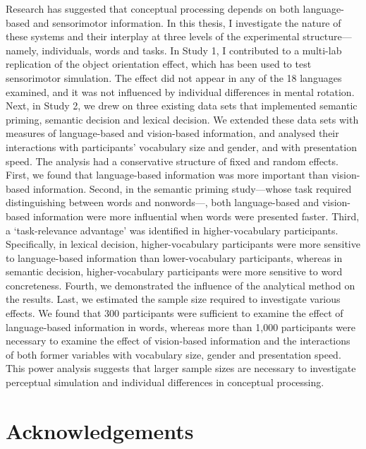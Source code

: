 \documentclass[
  12pt,
  man,floatsintext]{apa7}
\begin{document}
Research has suggested that conceptual processing depends on both language-based and sensorimotor information. In this thesis, I investigate the nature of these systems and their interplay at three levels of the experimental structure---namely, individuals, words and tasks. In Study 1, I contributed to a multi-lab replication of the object orientation effect, which has been used to test sensorimotor simulation. The effect did not appear in any of the 18 languages examined, and it was not influenced by individual differences in mental rotation. Next, in Study 2, we drew on three existing data sets that implemented semantic priming, semantic decision and lexical decision. We extended these data sets with measures of language-based and vision-based information, and analysed their interactions with participants' vocabulary size and gender, and with presentation speed. The analysis had a conservative structure of fixed and random effects. First, we found that language-based information was more important than vision-based information. Second, in the semantic priming study---whose task required distinguishing between words and nonwords---, both language-based and vision-based information were more influential when words were presented faster. Third, a `task-relevance advantage' was identified in higher-vocabulary participants. Specifically, in lexical decision, higher-vocabulary participants were more sensitive to language-based information than lower-vocabulary participants, whereas in semantic decision, higher-vocabulary participants were more sensitive to word concreteness. Fourth, we demonstrated the influence of the analytical method on the results. Last, we estimated the sample size required to investigate various effects. We found that 300 participants were sufficient to examine the effect of language-based information in words, whereas more than 1,000 participants were necessary to examine the effect of vision-based information and the interactions of both former variables with vocabulary size, gender and presentation speed. This power analysis suggests that larger sample sizes are necessary to investigate perceptual simulation and individual differences in conceptual processing.

\newpage

\begin{flushleft}
{
\tableofcontents
}
\end{flushleft}

\newpage

\hypertarget{acknowledgements}{%
\section{Acknowledgements}\label{acknowledgements}}
\end{document}
